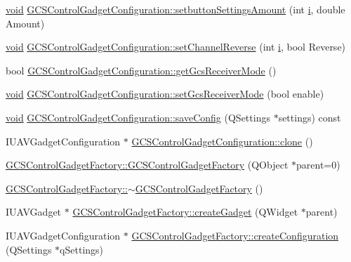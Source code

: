 \begin{DoxyCompactItemize}
\item 
\hyperlink{group___u_a_v_objects_plugin_ga444cf2ff3f0ecbe028adce838d373f5c}{void} \hyperlink{group___g_c_s_control_gadget_plugin_ga1f4c5dc258f49bb185227cb603dbd088}{\-G\-C\-S\-Control\-Gadget\-Configuration\-::setbutton\-Settings\-Amount} (int \hyperlink{uavobjecttemplate_8m_a6f6ccfcf58b31cb6412107d9d5281426}{i}, double \-Amount)
\item 
\hyperlink{group___u_a_v_objects_plugin_ga444cf2ff3f0ecbe028adce838d373f5c}{void} \hyperlink{group___g_c_s_control_gadget_plugin_gae6d33c4f9082a7cee4223f5793c82a45}{\-G\-C\-S\-Control\-Gadget\-Configuration\-::set\-Channel\-Reverse} (int \hyperlink{uavobjecttemplate_8m_a6f6ccfcf58b31cb6412107d9d5281426}{i}, bool \-Reverse)
\item 
bool \hyperlink{group___g_c_s_control_gadget_plugin_ga0b4cab5db5d6ffe6b93d7cb9be5de2c8}{\-G\-C\-S\-Control\-Gadget\-Configuration\-::get\-Gcs\-Receiver\-Mode} ()
\item 
\hyperlink{group___u_a_v_objects_plugin_ga444cf2ff3f0ecbe028adce838d373f5c}{void} \hyperlink{group___g_c_s_control_gadget_plugin_gac753abb3d8930e2296c8e9c056a4ee1f}{\-G\-C\-S\-Control\-Gadget\-Configuration\-::set\-Gcs\-Receiver\-Mode} (bool enable)
\item 
\hyperlink{group___u_a_v_objects_plugin_ga444cf2ff3f0ecbe028adce838d373f5c}{void} \hyperlink{group___g_c_s_control_gadget_plugin_ga5b7df7d2f0deddc5241efd65f199fb05}{\-G\-C\-S\-Control\-Gadget\-Configuration\-::save\-Config} (\-Q\-Settings $\ast$settings) const 
\item 
\-I\-U\-A\-V\-Gadget\-Configuration $\ast$ \hyperlink{group___g_c_s_control_gadget_plugin_ga2fcb5b20028b10d2b13fcebe34b82f0f}{\-G\-C\-S\-Control\-Gadget\-Configuration\-::clone} ()
\item 
\hyperlink{group___g_c_s_control_gadget_plugin_ga4c54b8d610c379bf28bff1793365f00a}{\-G\-C\-S\-Control\-Gadget\-Factory\-::\-G\-C\-S\-Control\-Gadget\-Factory} (\-Q\-Object $\ast$parent=0)
\item 
\hyperlink{group___g_c_s_control_gadget_plugin_ga1e3479dbedd932e780c0413327a44453}{\-G\-C\-S\-Control\-Gadget\-Factory\-::$\sim$\-G\-C\-S\-Control\-Gadget\-Factory} ()
\item 
\-I\-U\-A\-V\-Gadget $\ast$ \hyperlink{group___g_c_s_control_gadget_plugin_ga36b826b28ef2eea9aef96c03fe2afcb5}{\-G\-C\-S\-Control\-Gadget\-Factory\-::create\-Gadget} (\-Q\-Widget $\ast$parent)
\item 
\-I\-U\-A\-V\-Gadget\-Configuration $\ast$ \hyperlink{group___g_c_s_control_gadget_plugin_ga707c9075a9e10d166b1769820e643095}{\-G\-C\-S\-Control\-Gadget\-Factory\-::create\-Configuration} (\-Q\-Settings $\ast$q\-Settings)

\end{DoxyCompactItemize}
